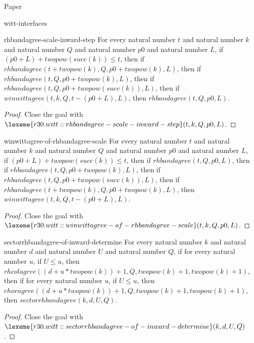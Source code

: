 \begin{lexlean}{Paper}
\begin{section}{witt-interfaces}
  \begin{theorem}{rhbandagree-scale-inward-step}
  For every natural number \(t\) and natural number \(k\) and natural number \(Q\) and natural number \(p0\) and natural number \(L\), if \((p0 + L) + twopow(succ(k)) ≤ t\), then if \(rhbandagree(t + twopow(k), Q, p0 + twopow(k), L)\), then if \(rhbandagree(t, Q, p0 + twopow(k), L)\), then if \(rhbandagree(t, Q, p0 + twopow(succ(k)), L)\), then if \(winwittagree(t, k, Q, t - (p0 + L), L)\), then \(rhbandagree(t, Q, p0, L)\).
  \begin{proof}
  Close the goal with \(\lexeme{r30.witt::rhbandagree-scale-inward-step}(t, k, Q, p0, L)\).
  \end{proof}
  \end{theorem}

  \begin{theorem}{winwittagree-of-rhbandagree-scale}
  For every natural number \(t\) and natural number \(k\) and natural number \(Q\) and natural number \(p0\) and natural number \(L\), if \((p0 + L) + twopow(succ(k)) ≤ t\), then if \(rhbandagree(t, Q, p0, L)\), then if \(rhbandagree(t, Q, p0 + twopow(k), L)\), then if \(rhbandagree(t, Q, p0 + twopow(succ(k)), L)\), then if \(rhbandagree(t + twopow(k), Q, p0 + twopow(k), L)\), then \(winwittagree(t, k, Q, t - (p0 + L), L)\).
  \begin{proof}
  Close the goal with \(\lexeme{r30.witt::winwittagree-of-rhbandagree-scale}(t, k, Q, p0, L)\).
  \end{proof}
  \end{theorem}

  \begin{theorem}{sectorrhbandagree-of-inward-determine}
  For every natural number \(k\) and natural number \(d\) and natural number \(U\) and natural number \(Q\), if for every natural number \(u\), if \(U ≤ u\), then \(rhcolagree((d + u * twopow(k)) + 1, Q, twopow(k) + 1, twopow(k) + 1)\), then if for every natural number \(u\), if \(U ≤ u\), then \(rhoragree((d + u * twopow(k)) + 1, Q, twopow(k) + 1, twopow(k) + 1)\), then \(sectorrhbandagree(k, d, U, Q)\).
  \begin{proof}
  Close the goal with \(\lexeme{r30.witt::sectorrhbandagree-of-inward-determine}(k, d, U, Q)\).
  \end{proof}
  \end{theorem}


\end{section}
\end{lexlean}
